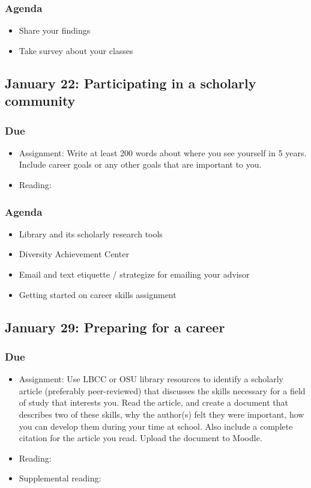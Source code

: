 \documentclass[12pt,article,oneside]{memoir}
\begin{document}
\subsubsection{Agenda}
\begin{itemize}
\item Share your findings
\item Take survey about your classes
\end{itemize} 








\subsection{January 22: Participating in a scholarly community}
\subsubsection{Due}
\begin{itemize}
 \item Assignment: Write at least 200 words about where you see yourself in 5 years.  Include career goals or any other goals that are important to you.
 \item Reading: \cite{wellsley}
\end{itemize}


\subsubsection{Agenda}
\begin{itemize}
 \item Library and its scholarly research tools
 \item Diversity Achievement Center
 \item Email and text etiquette / strategize for emailing your advisor
 \item Getting started on career skills assignment
\end{itemize}



\subsection{January 29: Preparing for a career}
\subsubsection{Due}
\begin{itemize}
 \item Assignment: Use LBCC or OSU library resources to identify a scholarly article (preferably peer-reviewed) that discusses the skills necessary for a field of study that interests you.  Read the article, and create a document that describes two of these skills, why the author(s) felt they were important, how you can develop them during your time at school. Also include a complete citation for the article you read.  Upload the document to Moodle.
 \item Reading: \cite{worksheets}
 \item Supplemental reading: \cite{crosswalk,ooh}
\end{itemize}
\end{document}
